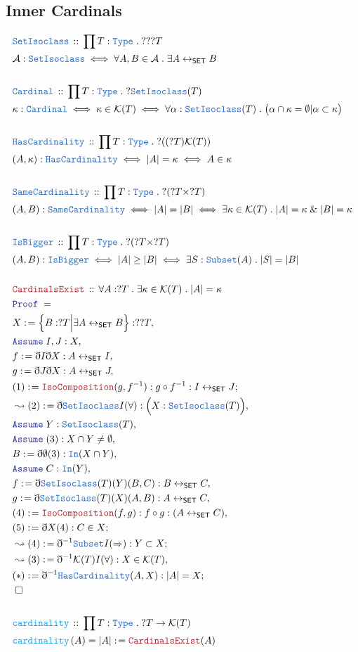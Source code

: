 \documentclass[12pt]{scrartcl}
\newcommand{\TYPE}[1]{\textcolor{NavyBlue}{\mathtt{#1}}}
\newcommand{\FUNC}[1]{\textcolor{Cerulean}{\mathtt{#1}}}
\newcommand{\LOGIC}[1]{\textcolor{Blue}{\mathtt{#1}}}
\newcommand{\THM}[1]{\textcolor{Maroon}{\mathtt{#1}}}
\renewcommand{\.}{\; . \;}
\newcommand{\de}{: \kern 0.1pc =}
\newcommand{\Act}[1]{\left( #1 \right)}
\newcommand{\Theorem}[2]{& \THM{#1} \, :: \, #2 \\ & \Proof = \\ }
\newcommand{\DeclareType}[2]{& \TYPE{#1} \, :: \, #2 \\}
\newcommand{\DefineType}[3]{& #1 : \TYPE{#2} \iff #3 \\}
\newcommand{\DefineNamedType}[4]{& #1 : \TYPE{#2} \iff #3 \iff #4 \\}
\newcommand{\DeclareFunc}[2]{& \FUNC{#1} \, :: \, #2 \\}
\newcommand{\DefineNamedFunc}[4]{&  \FUNC{#1}\Act{#2} = #3 \de #4 \\}
\newcommand{\Page}[1]{ \begin{align*} #1 \end{align*}   }
\newcommand{ \bd }{ \ByDef }
\renewcommand{\And}{\; \& \;}
\newcommand{\Type}{\TYPE{Type}}
\newcommand{\ToBij}{\leftrightarrow}
\newcommand{\Say}[3]{& #1 \de #2 : #3, \\}
\newcommand{\Conclude}[3]{& #1 \de #2 : #3; \\}
\newcommand{\Derive}[3]{& \leadsto #1 \de #2 : #3, \\}
\newcommand{\DeriveConclude}[3]{& \leadsto #1 \de #2 : #3 ; \\}
\newcommand{\A}{\LOGIC{Assume} \;}
\newcommand{\Assume}[2]{& \A #1 : #2, \\}
\newcommand{\QED}{\; \square}
\newcommand{\EndProof}{& \QED \\}
\newcommand{\ByDef}{\eth}
\newcommand{\Proof}{\LOGIC{Proof} \; }
\newcommand{\SET}{\mathsf{SET}}
\begin{document}
\subsection{Inner Cardinals}
\Page{
	\DeclareType{SetIsoclass}{\prod T : \Type \. ???T }
	\DefineType{\mathcal{A}}{SetIsoclass}{\forall A,B \in \mathcal{A} \. \exists A \ToBij_{\SET}  B}
	\\
	\DeclareType{Cardinal}{\prod T : \Type \. ?\TYPE{SetIsoclass}(T)}
	\DefineNamedType{\kappa}{ Cardinal }{ \kappa \in \mathcal{K}(T)}
	{ \forall \alpha : \TYPE{SetIsoclass}(T) \. 
		\big( \alpha \cap \kappa = \emptyset | \alpha \subset \kappa   \big)  
	}
	\\
	\DeclareType{HasCardinality}{ \prod T : \Type \. ?((?T)\mathcal{K}(T))}
	\DefineNamedType{(A,\kappa)}{HasCardinality}{|A| = \kappa}{A \in \kappa}
	\\
	\DeclareType{SameCardinality}{\prod T : \Type \. ?(?T \times ?T)}
	\DefineNamedType{(A,B)}{SameCardinality}{ |A| = |B|  }
	{\exists \kappa \in \mathcal{K}(T) \. |A| = \kappa \And |B| = \kappa}
	\\
	\DeclareType{IsBigger}{\prod T : \Type \. ?(?T \times ?T)}
	\DefineNamedType{(A,B)}{IsBigger}{|A| \ge |B|}{ \exists S : \TYPE{Subset}(A) \. |S| = |B| }
	\\
	\Theorem{CardinalsExist}{\forall A : ?T \. \exists \kappa \in \mathcal{K}(T) \. |A| = \kappa }
	\Say{X}{\Big\{ B : ?T \Big| \exists  A \ToBij_{\SET} B   \Big\}}{??T}
	\Assume{I,J}{ X  }
	\Say{f}{\bd I \bd X}{A \ToBij_{\SET} I}
	\Say{g}{\bd J \bd X}{A \ToBij_{\SET} J}
	\Conclude{(1)}{\THM{IsoComposition}(g,f^{-1})}{ g \circ f^{-1} : I \ToBij_{\SET} J  }
	\Derive{(2)}{\bd \TYPE{SetIsoclass}I(\forall)}{  \Big( X : \TYPE{SetIsoclass}(T) \Big)  }
        \Assume{Y}{\TYPE{SetIsoclass}(T)}
	\Assume{(3)}{X \cap Y \neq \emptyset}
	\Say{ B }{ \bd \emptyset (3) }{ \TYPE{In}(X \cap Y) }
	\Assume{C}{\TYPE{In}(Y)}
	\Say{f}{\bd \TYPE{SetIsoclass}(T)(Y)(B,C)}{  B \ToBij_{\SET} C  }
	\Say{g}{\bd \TYPE{SetIsoclass}(T)(X)(A,B)}{ A \ToBij_{\SET} C  }
	\Say{(4)}{\THM{IsoComposition}(f,g)}{f \circ g : (A \ToBij_{\SET} C) }
	\Conclude{(5)}{\bd X(4)}{ C \in X }
	\DeriveConclude{ (4) }{\bd^{-1} \TYPE{Subset} I(\Rightarrow)}{Y \subset X}
	\Derive{(3)}{ \bd^{-1} \mathcal{K}(T)  I(\forall) }{ X \in \mathcal{K}(T)  }
	\Conclude{(*)}{\bd^{-1} \TYPE{HasCardinality}(A,X )}{|A| = X }
	\EndProof
	\\
	\DeclareFunc{cardinality}{\prod T : \Type \. ?T \to \mathcal{K}(T)}
	\DefineNamedFunc{cardinality}{A}{|A|}{\THM{CardinalsExist}(A)}
}
\end{document}
